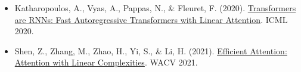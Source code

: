 \vspace{0.25em}
\begin{itemize}
\tightlist
\item
  Katharopoulos, A., Vyas, A., Pappas, N., \& Fleuret, F. (2020). \href{https://arxiv.org/abs/2006.16236}{Transformers are RNNs: Fast Autoregressive Transformers with Linear Attention}. ICML 2020.
\item
  Shen, Z., Zhang, M., Zhao, H., Yi, S., \& Li, H. (2021). \href{https://arxiv.org/abs/1812.01243}{Efficient Attention: Attention with Linear Complexities}. WACV 2021.
\end{itemize}

\clearpage

